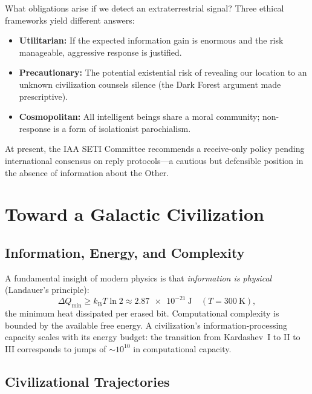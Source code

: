 \documentclass[12pt,a4paper]{article}
\newcommand{\kB}{k_{\mathrm{B}}}
\begin{document}
What obligations arise if we detect an extraterrestrial signal? Three ethical
frameworks yield different answers:
\begin{itemize}[noitemsep]
  \item \textbf{Utilitarian:} If the expected information gain is enormous and
    the risk manageable, aggressive response is justified.
  \item \textbf{Precautionary:} The potential existential risk of revealing our
    location to an unknown civilization counsels silence (the Dark Forest
    argument made prescriptive).
  \item \textbf{Cosmopolitan:} All intelligent beings share a moral community;
    non-response is a form of isolationist parochialism.
\end{itemize}
At present, the IAA SETI Committee recommends a receive-only policy pending
international consensus on reply protocols---a cautious but defensible position
in the absence of information about the Other.

\section{Toward a Galactic Civilization}

\subsection{Information, Energy, and Complexity}

A fundamental insight of modern physics is that \emph{information is physical}
(Landauer's principle):
\begin{equation}
  \Delta Q_{\min} \geq \kB T \ln 2 \approx \SI{2.87e-21}{\joule}
  \quad (T = \SI{300}{\kelvin}),
  \label{eq:landauer}
\end{equation}
the minimum heat dissipated per erased bit. Computational complexity is bounded
by the available free energy. A civilization's information-processing capacity
scales with its energy budget: the transition from Kardashev~I to II to III
corresponds to jumps of $\sim 10^{10}$ in computational capacity.

\subsection{Civilizational Trajectories}
\end{document}
